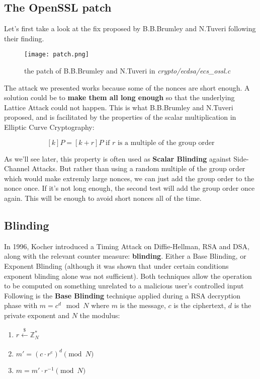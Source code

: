\documentclass[a4paper,11pt]{article}
\begin{document}
\subsection{The OpenSSL patch}

Let's first take a look at the fix proposed by B.B.Brumley and N.Tuveri following their finding.

\begin{figure}[H]
\texttt{[image: patch.png]}
\caption{the patch of B.B.Brumley and N.Tuveri in \textit{crypto/ecdsa/ecs\_ossl.c}}
\end{figure}

The attack we presented works because some of the nonces are short enough. A solution could be to \textbf{make them all long enough} so that the underlying Lattice Attack could not happen. This is what B.B.Brumley and N.Tuveri proposed, and is facilitated by the properties of the scalar multiplication in Elliptic Curve Cryptography:

$$ [k]P = [k + r]P \text{ if } r \text{ is a multiple of the group order} $$

As we'll see later, this property is often used as \textbf{Scalar Blinding} against Side-Channel Attacks. But rather than using a random multiple of the group order which would make extremly large nonces, we can just add the group order to the nonce once. If it's not long enough, the second test will add the group order once again. This will be enough to avoid short nonces all of the time.

\subsection{Blinding}

In 1996, Kocher\cite{Kocher} introduced a Timing Attack on Diffie-Hellman, RSA and DSA, along with the relevant counter measure: \textbf{blinding}. Either a Base Blinding, or Exponent Blinding (although it was shown that under certain conditions exponent blinding alone was not sufficient\cite{schindler}). Both techniques allow the operation to be computed on something unrelated to a malicious user's controlled input\\

Following is the \textbf{Base Blinding} technique applied during a RSA decryption phase with $m = c^d \mod{N}$ where $m$ is the message, $c$ is the ciphertext, $d$ is the private exponent and $N$ the modulus:

\begin{enumerate}
\item{$r  \xleftarrow[]{\$} \mathbb{Z}_N^{\ast}$}
\item{$m' = (c \cdot r^e)^d \pmod{N}$}
\item{$m = m' \cdot r^{-1} \pmod{N}$}
\end{enumerate}
\end{document}

